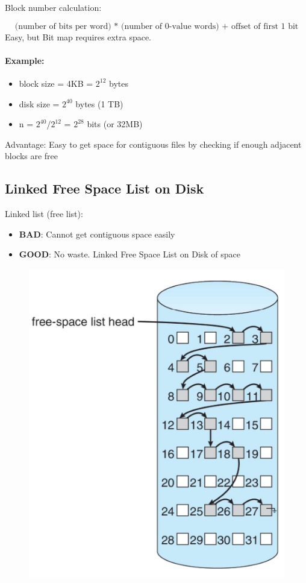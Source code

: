 Block number calculation:

\begin{equation*}
    \text{(number of bits per word) * (number of 0-value words) + offset of first 1 bit}
\end{equation*}
Easy, but Bit map requires extra space.

\paragraph{Example: }



\begin{itemize}
\centering
    \item []block size = 4KB = $2^{12}$ bytes
    \item[] disk size = $2^{40}$ bytes (1 TB)
    \item[] n = $2^{40}$/$2^{12}$ = $2^{28}$ bits (or 32MB)
\end{itemize}

Advantage: Easy to get space for contiguous files by checking if enough
adjacent blocks are free

\subsection{Linked Free Space List on Disk}

Linked list (free list):

\begin{itemize}
    \item \textbf{BAD}: Cannot get contiguous space easily
    \item \textbf{GOOD}: No waste. Linked Free Space List on Disk of space
\end{itemize}


\begin{figure}[h!]
    \centering
    \includegraphics[width=0.4\linewidth]{img/andjfgt.png}
\end{figure}



